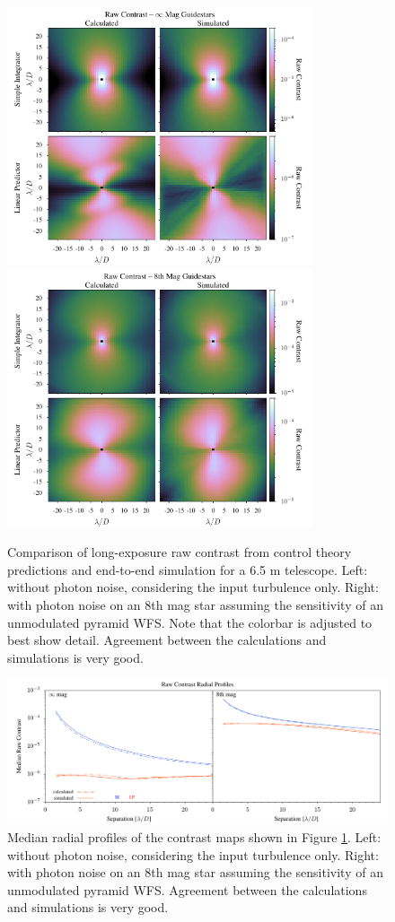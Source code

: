 \documentclass[10pt,preprint]{aastex631}
\begin{document}
\begin{figure}
\hspace{-0.3in}
\includegraphics[width=3.54in]{contrast0mag.pdf}
\includegraphics[width=3.54in]{contrast8mag.pdf}
\caption{Comparison of long-exposure raw contrast from control theory predictions and end-to-end simulation for a 6.5 m telescope. Left: without photon noise, considering the input turbulence only.  Right: with photon noise on an 8th mag star assuming the sensitivity of an unmodulated pyramid WFS. Note that the colorbar is adjusted to best show detail.  Agreement between the calculations and simulations is very good.\label{fig:contrast_2Dcomp}}
\end{figure}

\begin{figure}
\hspace{-0.3in}
\includegraphics[width=6.5in]{contrastRP.pdf}
\caption{Median radial profiles of the contrast maps shown in Figure \ref{fig:contrast_2Dcomp}.  Left: without photon noise, considering the input turbulence only.  Right: with photon noise on an 8th mag star assuming the sensitivity of an unmodulated pyramid WFS. Agreement between the calculations and simulations is very good.\label{fig:contrast_radprof}}
\end{figure}
\end{document}
